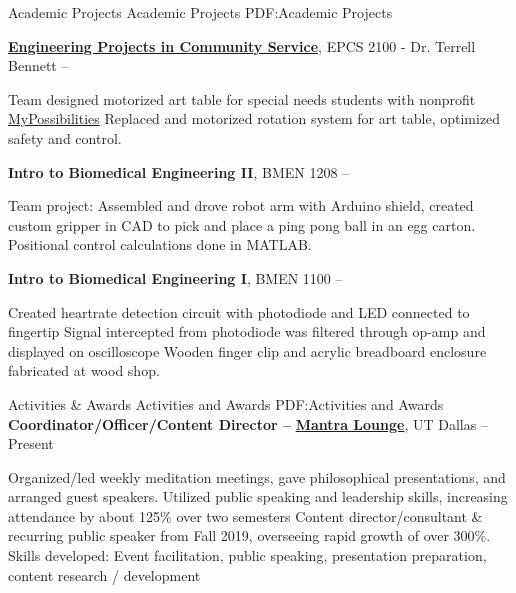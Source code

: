 \documentclass[letterpaper,MMMyyyy,nonstopmode]{simpleresumecv}
\begin{document}
\begin{Body}
\Section
{Academic Projects}
{Academic Projects}
{PDF:Academic Projects}

\Entry
\textbf{\href{https://epics.utdallas.edu}{Engineering Projects in Community Service}}, EPCS 2100 - Dr. Terrell Bennett
\hfill
{} -- 
\par
\begin{Detail}
\SubBulletItem
Team designed motorized art table for special needs students with nonprofit \href{https://mypossibilities.org}{MyPossibilities} 
\SubBulletItem
Replaced and motorized rotation system for art table, optimized safety and control.
\end{Detail}
\Entry
\textbf{Intro to Biomedical Engineering II}, BMEN 1208
\hfill
{} -- 
\par
\begin{Detail}
\SubBulletItem
Team project: Assembled and drove robot arm with Arduino shield, created custom gripper in CAD to pick and place a ping pong ball in an egg carton. Positional control calculations done in MATLAB.
\end{Detail}
\Entry
\textbf{Intro to Biomedical Engineering I}, BMEN 1100
\hfill
{} -- 
\begin{Detail}
\SubBulletItem
Created heartrate detection circuit with photodiode and LED connected to fingertip
\SubBulletItem
Signal intercepted from photodiode was filtered through op-amp and displayed on oscilloscope
\SubBulletItem
Wooden finger clip and acrylic breadboard enclosure fabricated at wood shop.
\end{Detail}


\Section
{Activities \newline 
\& Awards}
{Activities and Awards}
{PDF:Activities and Awards}
\Entry
\textbf{Coordinator/Officer/Content Director --} \textbf{\href{https://www.facebook.com/mantraloungeUTD/}{Mantra Lounge}},
UT Dallas
\hfill
{} --
Present%
\begin{Detail}
\SubBulletItem
Organized/led weekly meditation meetings, gave philosophical presentations, and arranged guest speakers.
\SubBulletItem
Utilized public speaking and leadership skills, increasing attendance by about 125\% over two semesters
\SubBulletItem
Content director/consultant \& recurring public speaker from Fall 2019, overseeing rapid growth of over 300\%.
\SubBulletItem
Skills developed: Event facilitation, public speaking, presentation preparation, content research / development
\end{Detail}


\end{Body}
\end{document}
